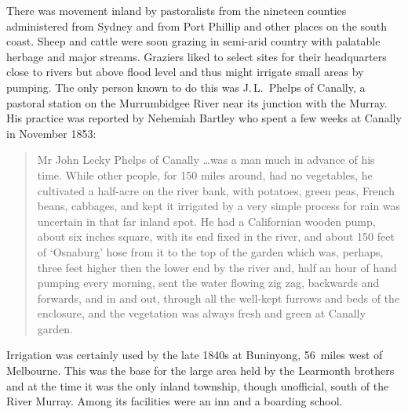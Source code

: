 There was movement inland by pastoralists from the nineteen counties
administered from Sydney  and from Port Phillip
 and other places on the south coast.  Sheep and
cattle were soon grazing in semi-arid country with palatable herbage
and major streams.  Graziers liked to select sites for their
headquarters close to rivers but above flood level and thus might
irrigate small areas by pumping.  The only person known to do this was
J.\,L.~Phelps  of Canally,
 a
pastoral station on the Murrumbidgee River 
near its junction with the Murray.  His practice
was reported by Nehemiah Bartley  who spent a few
weeks at Canally in November 1853:
\begin{quote}
	Mr John Lecky Phelps of Canally \ldots was a man much in
	advance of his time.  While other people, for 150 miles
	around, had no vegetables, he cultivated a half-acre on the
	river bank, with potatoes, green peas, French beans, cabbages,
	and kept it irrigated by a very simple process for rain was
	uncertain in that far inland spot.  He had a Californian
	wooden pump, about six inches square, with its end fixed in
	the river, and about 150 feet of `Osnaburg' hose from it to
	the top of the garden which was, perhaps, three feet higher
	then the lower end by the river and, half an hour of hand
	pumping every morning, sent the water flowing zig zag,
	backwards and forwards, and in and out, through all the
	well-kept furrows and beds of the enclosure, and the
	vegetation was always fresh and green at Canally
	garden.
\end{quote}

Irrigation was certainly used by the late 1840s at Buninyong,
 56~miles
west of Melbourne.  This was the base for the large area held by the
Learmonth brothers  and at the time it was the
only inland township, though unofficial, south of the River Murray.
Among its facilities were an inn and a boarding school.

